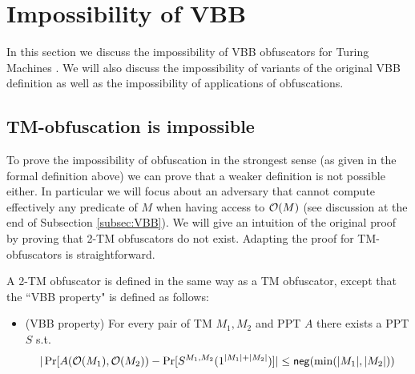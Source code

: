 \section{Impossibility of VBB}
\label{sec:VBB-imp}

In this section we discuss the impossibility of VBB obfuscators for Turing Machines \cite{VBB-imp}. We will also discuss the impossibility of variants of the original VBB definition as well as the impossibility of applications of obfuscations.


\subsection{TM-obfuscation is impossible}

To prove the impossibility of obfuscation in the strongest sense (as given in the formal definition above) we can prove that a weaker definition is not possible either. In particular we will focus about an adversary that cannot compute effectively any predicate of $M$ when having access to $\mathcal{O}(M)$ (see discussion at the end of Subsection \ref{subsec:VBB}).
We will give an intuition of the original proof by proving that 2-TM obfuscators do not exist. Adapting the proof for TM-obfuscators is straightforward.

\begin{mydef}
	A 2-TM obfuscator is defined in the same way as a TM obfuscator, except that the ``VBB property" is defined as follows:
	\begin{itemize}
		\item (VBB property) For every pair of TM $M_1, M_2$ and PPT $A$ there exists a PPT $S$ s.t. 
		$$ |\Pr[A(\mathcal{O}(M_1), \mathcal{O}(M_2)) - \Pr[ S^{M_1,M_2}(1^{|M_1|+|M_2|})]| \leq \mathsf{neg}(\min(|M_1|, |M_2|)) $$
	\end{itemize}
\end{mydef} 

